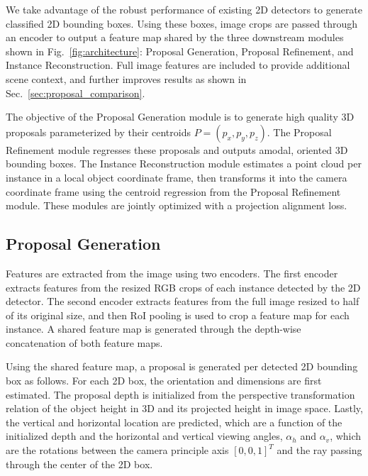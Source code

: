 \documentclass[10pt,twocolumn,letterpaper]{article}
\begin{document}
	We take advantage of the robust performance of existing 2D detectors to generate classified 2D bounding boxes. Using these boxes, image crops are passed through an encoder to output a feature map shared by the three downstream modules shown in Fig.~\ref{fig:architecture}: Proposal Generation, Proposal Refinement, and Instance Reconstruction. Full image features are included to provide additional scene context, and further improves results as shown in Sec.~\ref{sec:proposal_comparison}. 
	
	The objective of the Proposal Generation module is to generate high quality 3D proposals parameterized by their centroids $P = (p_x, p_y, p_z)$. The Proposal Refinement module regresses these proposals and outputs amodal, oriented 3D bounding boxes. The Instance Reconstruction module estimates a point cloud per instance in a local object coordinate frame, then transforms it into the camera coordinate frame using the centroid regression from the Proposal Refinement module. These modules are jointly optimized with a projection alignment loss.
	
	\subsection{Proposal Generation}\label{sec:proposal_generation}
	Features are extracted from the image using two encoders. The first encoder extracts features from the resized RGB crops of each instance detected by the 2D detector. The second encoder extracts features from the full image resized to half of its original size, and then RoI pooling \cite{girshick_fast} is used to crop a feature map for each instance. A shared feature map is generated through the depth-wise concatenation of both feature maps.
	
	Using the shared feature map, a proposal is generated per detected 2D bounding box as follows. For each 2D box, the orientation and dimensions are first estimated. The proposal depth is initialized from the perspective transformation relation of the object height in 3D and its projected height in image space. Lastly, the vertical and horizontal location are predicted, which are a function of the initialized depth and the horizontal and vertical viewing angles, $\alpha_h$ and $\alpha_v$, which are the rotations between the camera principle axis $[0, 0, 1]^T$ and the ray passing through the center of the 2D box.
	
\end{document}
